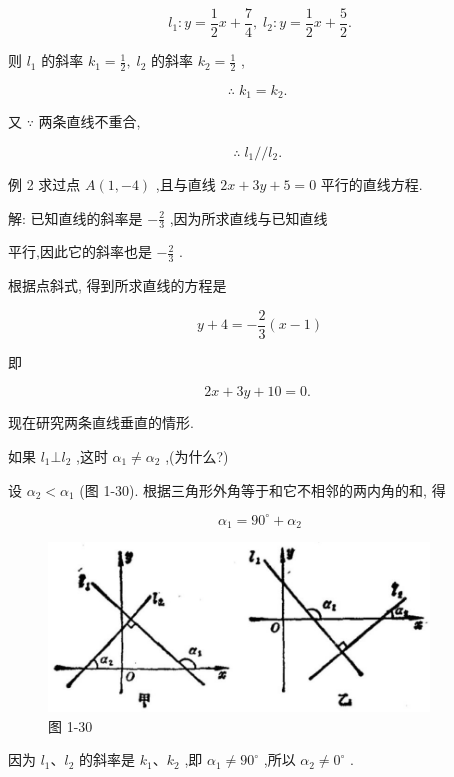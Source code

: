 \documentclass[lang=cn,newtx,10pt,scheme=chinese]{elegantbook}
\begin{document}
\[
    {l}_{1} : y = \frac{1}{2}x + \frac{7}{4},\;{l}_{2} : y = \frac{1}{2}x + \frac{5}{2}.
\]

则 \({l}_{1}\) 的斜率 \({k}_{1} = \frac{1}{2},\;{l}_{2}\) 的斜率 \({k}_{2} = \frac{1}{2}\) ,

\[
  \therefore \;{k}_{1} = {k}_{2}\text{. }
\]

又 \(\because\) 两条直线不重合,

\[
  \therefore \;{l}_{1}//{l}_{2}\text{. }
\]

例 2 求过点 \(A\left( {1, - 4}\right)\) ,且与直线 \({2x} + {3y} + 5 = 0\) 平行的直线方程.

解: 已知直线的斜率是 \(- \frac{2}{3}\) ,因为所求直线与已知直线

平行,因此它的斜率也是 \(- \frac{2}{3}\) .

根据点斜式, 得到所求直线的方程是

\[
  y + 4 = - \frac{2}{3}\left( {x - 1}\right)
\]

即

\[
    {2x} + {3y} + {10} = 0\text{. }
\]

现在研究两条直线垂直的情形.

如果 \({l}_{1} \bot {l}_{2}\) ,这时 \({\alpha }_{1} \neq {\alpha }_{2}\) ,(为什么?)

设 \({\alpha }_{2} < {\alpha }_{1}\) (图 1-30). 根据三角形外角等于和它不相邻的两内角的和, 得

\[
    {\alpha }_{1} = {90}^{ \circ } + {\alpha }_{2}
\]

\begin{figure}[h]
  \centering
  \includegraphics[max width=0.9\textwidth]{images/01912cc2-ffb6-728e-9ae7-b113ff05c64b_44_991124.jpg}
  \caption{图 1-30}
\end{figure}



因为 \({l}_{1}\text{、}{l}_{2}\) 的斜率是 \({k}_{1}\text{、}{k}_{2}\) ,即 \({\alpha }_{1} \neq {90}^{ \circ }\) ,所以 \({\alpha }_{2} \neq {0}^{ \circ }\) .
\end{document}
